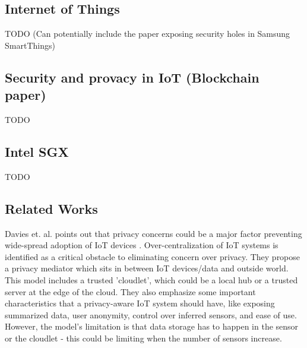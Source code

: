 \subsection{Internet of Things}
TODO
(Can potentially include the paper exposing security holes in Samsung SmartThings)

\subsection{Security and provacy in IoT (Blockchain paper)}
TODO

\subsection{Intel SGX}
TODO

\subsection{Related Works}
Davies et. al. points out that privacy concerns could be a major factor preventing wide-spread adoption of IoT devices \cite{davies}. Over-centralization of IoT systems is identified as a critical obstacle to eliminating concern over privacy. They propose a privacy mediator which sits in between IoT devices/data and outside world. This model includes a trusted 'cloudlet', which could be a local hub or a trusted server at the edge of the cloud. They also emphasize some important characteristics that a privacy-aware IoT system should have, like exposing summarized data, user anonymity, control over inferred sensors, and ease of use. However, the model's limitation is that data storage has to happen in the sensor or the cloudlet - this could be limiting when the number of sensors increase.